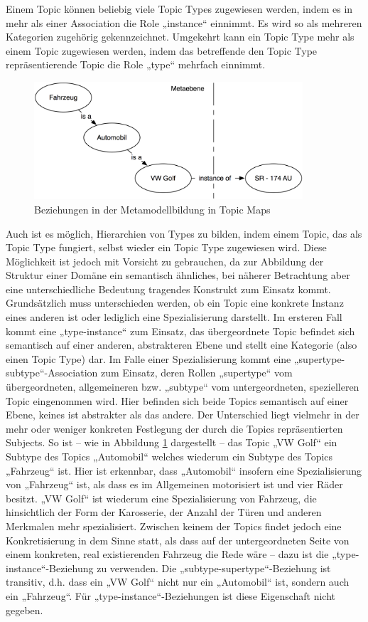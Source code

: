 Einem Topic können beliebig viele Topic Types zugewiesen werden, indem es in mehr als einer Association die Role „instance“ einnimmt. Es wird so als mehreren Kategorien zugehörig gekennzeichnet. Umgekehrt kann ein Topic Type mehr als einem Topic zugewiesen werden, indem das betreffende den Topic Type repräsentierende Topic die Role „type“ mehrfach einnimmt.

\begin{figure}[htbp]
	\centering
		\includegraphics[width=10cm]{img/Persistenz/MetaModelExample.png}
	\caption{Beziehungen in der Metamodellbildung in Topic Maps}
	\label{fig:img_Persistenz_MetaModelExample}
\end{figure}

Auch ist es möglich, Hierarchien von Types zu bilden, indem einem Topic, das als Topic Type fungiert, selbst wieder ein Topic Type zugewiesen wird. Diese Möglichkeit ist jedoch mit Vorsicht zu gebrauchen, da zur Abbildung der Struktur einer Domäne ein semantisch ähnliches, bei näherer Betrachtung aber eine unterschiedliche Bedeutung tragendes Konstrukt zum Einsatz kommt. Grundsätzlich muss unterschieden werden, ob ein Topic eine konkrete Instanz eines anderen ist oder lediglich eine Spezialisierung darstellt. Im ersteren Fall kommt eine „type-instance“ zum Einsatz, das übergeordnete Topic befindet sich semantisch auf einer anderen, abstrakteren Ebene und stellt eine Kategorie (also einen Topic Type) dar. Im Falle einer Spezialisierung kommt eine „supertype-subtype“-Association zum Einsatz, deren Rollen „supertype“ vom übergeordneten, allgemeineren bzw. „subtype“ vom untergeordneten, spezielleren Topic eingenommen wird. Hier befinden sich beide Topics semantisch auf einer Ebene, keines ist abstrakter als das andere. Der Unterschied liegt vielmehr in der mehr oder weniger konkreten Festlegung der durch die Topics repräsentierten Subjects. So ist -- wie in Abbildung \ref{fig:img_Persistenz_MetaModelExample} dargestellt -- das Topic „VW Golf“ ein Subtype des Topics „Automobil“ welches wiederum ein Subtype des Topics „Fahrzeug“ ist. Hier ist erkennbar, dass „Automobil“ insofern eine Spezialisierung von „Fahrzeug“ ist, als dass es im Allgemeinen motorisiert ist und vier Räder besitzt. „VW Golf“ ist wiederum eine Spezialisierung von Fahrzeug, die hinsichtlich der Form der Karosserie, der Anzahl der Türen und anderen Merkmalen mehr spezialisiert. Zwischen keinem der Topics findet jedoch eine Konkretisierung in dem Sinne statt, als dass auf der untergeordneten Seite von einem konkreten, real existierenden Fahrzeug die Rede wäre -- dazu ist die „type-instance“-Beziehung zu verwenden. Die „subtype-supertype“-Beziehung ist transitiv, d.h. dass ein „VW Golf“ nicht nur ein „Automobil“ ist, sondern auch ein „Fahrzeug“. Für „type-instance“-Beziehungen ist diese Eigenschaft nicht gegeben. 

